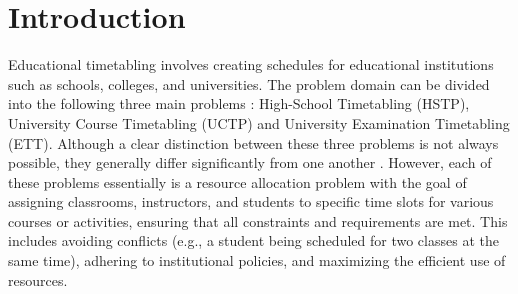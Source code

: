 \documentclass[sigconf]{acmart}
\begin{document}

\section{Introduction}
Educational timetabling involves creating schedules for educational
institutions such as schools, colleges, and universities.
The problem domain can be divided into the following three main problems
\cite{kingston2013educational,schaerf1999survey}:
High-School Timetabling (HSTP), University Course Timetabling (UCTP) and
University Examination Timetabling (ETT).
Although a clear distinction between these three problems is not always
possible, they generally differ significantly from one another
\cite{Beligiannis2009}.
However, each of these problems essentially is a resource allocation problem
with the goal of assigning classrooms, instructors, and students to specific
time slots for various courses or activities, ensuring that all constraints and
requirements are met.
This includes avoiding conflicts (e.g., a student being scheduled for two
classes at the same time), adhering to institutional policies, and maximizing
the efficient use of resources.
\end{document}
